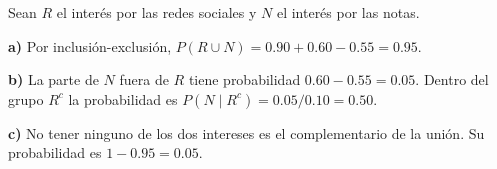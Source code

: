 Sean $R$ el interés por las redes sociales y $N$ el interés
por las notas.

\textbf{a)} Por inclusión-exclusión,
$P(R\cup N)=0.90+0.60-0.55=\boxed{0.95}$.

\textbf{b)} La parte de $N$ fuera de $R$ tiene probabilidad
$0.60-0.55=0.05$. Dentro del grupo $R^c$ la probabilidad
es $P(N\mid R^c)=0.05/0.10=\boxed{0.50}$.

\textbf{c)} No tener ninguno de los dos intereses es el
complementario de la unión. Su probabilidad es
$1-0.95=\boxed{0.05}$.
